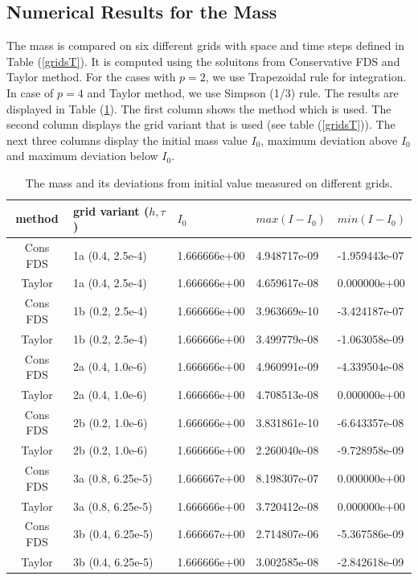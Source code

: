 \documentclass[%
 aip,
cp,  
 amsmath,amssymb,
 reprint,
]{iopconfser}
\newcommand{\rf}[1]{(\ref{#1})}
\begin{document}
\subsection{Numerical Results for the Mass}
The mass is compared on six different grids with space and time steps defined in Table \rf{gridsT}. It is computed using the soluitons from Conservative FDS and Taylor method. For the cases with 
$p=2$, we use Trapezoidal rule for integration. In case of $p=4$ and Taylor method, we use Simpson (1/3) rule. The results are displayed in Table \rf{tableMass}. The first column shows the method which is used. The second column displays the grid variant that is used (see table \rf{gridsT}). The next three columns display the initial mass value $I_0$, maximum deviation above $I_0$ and maximum deviation below $I_0$.
\begin{table}[ht]
\centering
\small
		\begin{tabular}{||c|l|l|l|l||}
			\hline
method        & grid variant ($h,\tau$)& $I_0$ &   $max(I-I_0)$ & $min(I-I_0)$  \\
   			\hline 
Cons FDS            &  1a (0.4, 2.5e-4) & 1.666666e+00 &  4.948717e-09 & -1.959443e-07                    \\
 Taylor               &  1a (0.4, 2.5e-4) & 1.666666e+00 &  4.659617e-08 & 0.000000e+00                \\
Cons FDS            &  1b (0.2, 2.5e-4) & 1.666666e+00 & 3.963669e-10 & -3.424187e-07             \\
 Taylor               &  1b (0.2, 2.5e-4) & 1.666666e+00 & 3.499779e-08 & -1.063058e-09               \\
	   		\hline
			\hline
Cons FDS             & 2a (0.4, 1.0e-6) & 1.666666e+00 & 4.960991e-09 & -4.339504e-08                    \\
 Taylor                & 2a (0.4, 1.0e-6) & 1.666666e+00 & 4.708513e-08 & 0.000000e+00                   \\
Cons FDS            & 2b (0.2, 1.0e-6) & 1.666666e+00 & 3.831861e-10 & -6.643357e-08                  \\
 Taylor                & 2b (0.2, 1.0e-6) & 1.666666e+00 & 2.260040e-08 & -9.728958e-09                      \\
	   		\hline
			\hline
Cons FDS           &  3a (0.8, 6.25e-5) & 1.666667e+00 & 8.198307e-07 & 0.000000e+00                    \\
Taylor                &  3a (0.8, 6.25e-5) & 1.666666e+00 &  3.720412e-08 & 0.000000e+00                      \\
Cons FDS           &  3b (0.4, 6.25e-5) & 1.666667e+00 &  2.714807e-06 & -5.367586e-09                     \\
Taylor                &  3b (0.4, 6.25e-5) & 1.666666e+00 &  3.002585e-08 & -2.842618e-09                      \\
			\hline 
			\hline
		\end{tabular}
		\caption{ The mass and its deviations from initial value measured on different grids. }
\label{tableMass}
\end{table}
\end{document}

